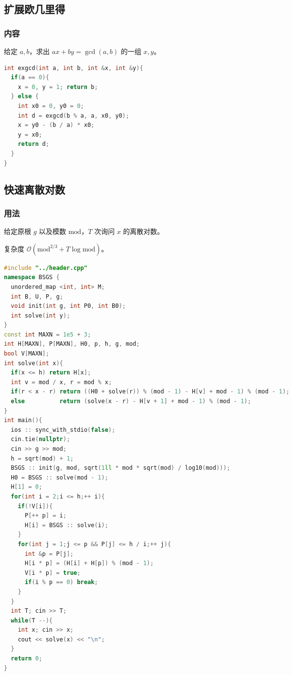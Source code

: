 \documentclass[10pt]{ctexart}
\begin{document}
\begin{multicols}{3}
    \subsection{扩展欧几里得}\label{ux6269ux5c55ux6b27ux51e0ux91ccux5f97}

    \subsubsection{内容}\label{ux5185ux5bb9}

    给定 \(a, b\)，求出 \(ax+by=\gcd(a, b)\) 的一组 \(x, y\)。

\begin{lstlisting}[language={C++}]
int exgcd(int a, int b, int &x, int &y){
  if(a == 0){
    x = 0, y = 1; return b;
  } else {
    int x0 = 0, y0 = 0;
    int d = exgcd(b % a, a, x0, y0);
    x = y0 - (b / a) * x0;
    y = x0;
    return d;
  }
}
\end{lstlisting}

    \subsection{快速离散对数}\label{ux5febux901fux79bbux6563ux5bf9ux6570}

    \subsubsection{用法}\label{ux7528ux6cd5-6}

    给定原根 \(g\) 以及模数 \(\mathrm{mod}\)，\(T\) 次询问 \(x\)
    的离散对数。

    复杂度 \(\mathcal O(\mathrm{mod}^{2/3} + T \log \mathrm{mod})\)。

\begin{lstlisting}[language={C++}]
#include "../header.cpp"
namespace BSGS {
  unordered_map <int, int> M;
  int B, U, P, g;
  void init(int g, int P0, int B0);
  int solve(int y);
}
const int MAXN = 1e5 + 3;
int H[MAXN], P[MAXN], H0, p, h, g, mod;
bool V[MAXN];
int solve(int x){
  if(x <= h) return H[x];
  int v = mod / x, r = mod % x;
  if(r < x - r) return ((H0 + solve(r)) % (mod - 1) - H[v] + mod - 1) % (mod - 1);
  else          return (solve(x - r) - H[v + 1] + mod - 1) % (mod - 1);
}
int main(){
  ios :: sync_with_stdio(false);
  cin.tie(nullptr);
  cin >> g >> mod;
  h = sqrt(mod) + 1;
  BSGS :: init(g, mod, sqrt(1ll * mod * sqrt(mod) / log10(mod)));
  H0 = BSGS :: solve(mod - 1);
  H[1] = 0;
  for(int i = 2;i <= h;++ i){
    if(!V[i]){
      P[++ p] = i;
      H[i] = BSGS :: solve(i);
    }
    for(int j = 1;j <= p && P[j] <= h / i;++ j){
      int &p = P[j];
      H[i * p] = (H[i] + H[p]) % (mod - 1);
      V[i * p] = true;
      if(i % p == 0) break;
    }
  }
  int T; cin >> T;
  while(T --){
    int x; cin >> x;
    cout << solve(x) << "\n";
  }
  return 0;
}
\end{lstlisting}


\end{multicols}
\end{document}
